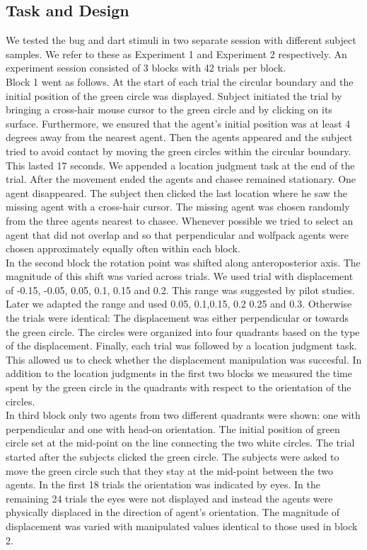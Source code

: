 \documentclass{article}
\begin{document}
\subsection{Task and Design}
We tested the bug and dart stimuli in two separate session with different subject samples. 
We refer to these as Experiment 1 and Experiment 2 respectively.
An experiment session consisted of 3 blocks with 42 trials per block.\\
Block 1 went as follows. 
At the start of each trial the circular boundary and the initial position of the green circle was displayed. 
Subject initiated the trial by bringing a cross-hair mouse cursor to the green circle and by clicking on its surface. 
Furthermore, we ensured that the agent's initial position was at least 4 degrees away from the nearest agent. 
Then the agents appeared and the subject tried to avoid contact by moving the green circles within the circular boundary. 
This lasted 17 seconds. 
We appended a location judgment task at the end of the trial. 
After the movement ended the agents and chasee remained stationary. 
One agent disappeared. 
The subject then clicked the last location where he saw the missing agent with a cross-hair cursor. 
The missing agent was chosen randomly from the three agents nearest to chasee. 
Whenever possible we tried to select an agent that did not overlap and so that perpendicular and wolfpack agents were chosen approximately equally often within each block. \\
In the second block the rotation point was shifted along anteroposterior axis. The magnitude of this shift was varied across trials. We used trial with displacement of -0.15, -0.05, 0.05, 0.1, 0.15 and 0.2. This range was suggested by pilot studies. Later we adapted the range and used 0.05, 0.1,0.15, 0.2 0.25 and 0.3. Otherwise the trials were identical: The displacement was either perpendicular or towards the green circle. The circles were organized into four quadrants based on the type of the displacement. Finally, each trial was followed by a location judgment task. This allowed us to check whether the displacement manipulation was succesful. In addition to the location judgments in the first two blocks we measured the time spent by the green circle in the quadrants with respect to the orientation of the circles.\\
In third block only two agents from two different quadrants were shown: one with perpendicular and one with head-on orientation. The initial position of green circle set at the mid-point on the line connecting the two white circles. The trial started after the subjects clicked the green circle. The subjects were asked to move the green circle such that they stay at the mid-point between the two agents. In the first 18 trials the orientation was indicated by eyes. In the remaining 24 trials the eyes were not displayed and instead the agents were physically displaced in the direction of agent's orientation. The magnitude of displacement was varied with manipulated values identical to those used in block 2.\\
\end{document}
